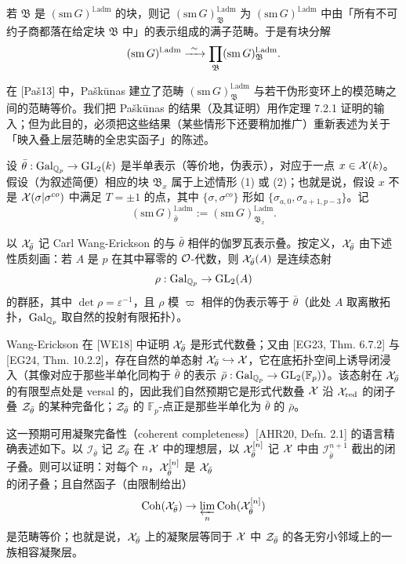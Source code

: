 若 $\mathfrak B$ 是 $(\mathrm{sm}\,G)^{\mathrm{l.adm}}$ 的块，则记 $(\mathrm{sm}\,G)^{\mathrm{l.adm}}_{\mathfrak B}$ 为 $(\mathrm{sm}\,G)^{\mathrm{l.adm}}$ 中由「所有不可约子商都落在给定块 $\mathfrak B$ 中」的表示组成的满子范畴。于是有块分解
\[
(\mathrm{sm}\,G)^{\mathrm{l.adm}}\xrightarrow{\ \sim\ }\prod_{\mathfrak B}(\mathrm{sm}\,G)^{\mathrm{l.adm}}_{\mathfrak B}.
\]

在 [Paš13] 中，Paškūnas 建立了范畴 $(\mathrm{sm}\,G)^{\mathrm{l.adm}}_{\mathfrak B}$ 与若干伪形变环上的模范畴之间的范畴等价。我们把 Paškūnas 的结果（及其证明）用作定理 7.2.1 证明的输入；但为此目的，必须把这些结果（某些情形下还要稍加推广）重新表述为关于「映入叠上层范畴的全忠实函子」的陈述。

设 $\bar\theta:\operatorname{Gal}_{\mathbb{Q}_p}\to\mathrm{GL}_2(k)$ 是半单表示（等价地，伪表示），对应于一点 $x\in\mathcal{X}(k)$。假设（为叙述简便）相应的块 $\mathfrak B_x$ 属于上述情形 (1) 或 (2)；也就是说，假设 $x$ 不是 $\mathcal{X}(\sigma|\sigma^{co})$ 中满足 $T=\pm1$ 的点，其中 $\{\sigma,\sigma^{co}\}$ 形如 $\{\sigma_{a,0},\sigma_{a+1,p-3}\}$。记
\[
(\mathrm{sm}\,G)^{\mathrm{l.adm}}_{\bar\theta}:=(\mathrm{sm}\,G)^{\mathrm{l.adm}}_{\mathfrak B_x}.
\]

以 $\mathcal{X}_{\bar\theta}$ 记 Carl Wang-Erickson 的与 $\bar\theta$ 相伴的伽罗瓦表示叠。按定义，$\mathcal{X}_{\bar\theta}$ 由下述性质刻画：若 $A$ 是 $p$ 在其中幂零的 $\mathcal{O}$-代数，则 $\mathcal{X}_{\bar\theta}(A)$ 是连续态射
\[
\rho:\operatorname{Gal}_{\mathbb{Q}_p}\to\mathrm{GL}_2(A)
\]
的群胚，其中 $\det\rho=\varepsilon^{-1}$，且 $\rho$ 模 $\varpi$ 相伴的伪表示等于 $\bar\theta$（此处 $A$ 取离散拓扑，$\operatorname{Gal}_{\mathbb{Q}_p}$ 取自然的投射有限拓扑）。

Wang-Erickson 在 [WE18] 中证明 $\mathcal{X}_{\bar\theta}$ 是形式代数叠；又由 [EG23, Thm. 6.7.2] 与 [EG24, Thm. 10.2.2]，存在自然的单态射 $\mathcal{X}_{\bar\theta}\hookrightarrow\mathcal{X}$，它在底拓扑空间上诱导闭浸入（其像对应于那些半单化同构于 $\bar\theta$ 的表示 $\bar\rho:\operatorname{Gal}_{\mathbb{Q}_p}\to\mathrm{GL}_2(\mathbb F_p)$）。该态射在 $\mathcal{X}_{\bar\theta}$ 的有限型点处是 versal 的，因此我们自然预期它是形式代数叠 $\mathcal{X}$ 沿 $\mathcal{X}_{\mathrm{red}}$ 的闭子叠 $\mathcal{Z}_{\bar\theta}$ 的某种完备化；$\mathcal{Z}_{\bar\theta}$ 的 $\mathbb F_p$-点正是那些半单化为 $\bar\theta$ 的 $\bar\rho$。

这一预期可用凝聚完备性（coherent completeness）[AHR20, Defn. 2.1] 的语言精确表述如下。以 $\mathcal I_{\bar\theta}$ 记 $\mathcal{Z}_{\bar\theta}$ 在 $\mathcal{X}$ 中的理想层，以 $\mathcal{X}^{[n]}_{\bar\theta}$ 记 $\mathcal{X}$ 中由 $\mathcal I^{n+1}_{\bar\theta}$ 截出的闭子叠。则可以证明：对每个 $n$，$\mathcal{X}^{[n]}_{\bar\theta}$ 是 $\mathcal{X}_{\bar\theta}$ 的闭子叠；且自然函子（由限制给出）
\[
\operatorname{Coh}(\mathcal{X}_{\bar\theta})\to\varprojlim_n\operatorname{Coh}(\mathcal{X}^{[n]}_{\bar\theta})
\]
是范畴等价；也就是说，$\mathcal{X}_{\bar\theta}$ 上的凝聚层等同于 $\mathcal{X}$ 中 $\mathcal{Z}_{\bar\theta}$ 的各无穷小邻域上的一族相容凝聚层。

